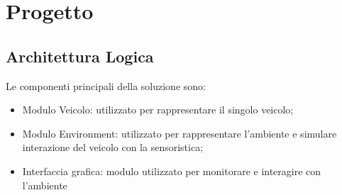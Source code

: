 \documentclass{memoir}
\begin{document}
%

\chapter{Progetto}

\section{Architettura Logica}
\label{sec:arclog}
Le componenti principali della soluzione sono:
\begin{itemize}
\item Modulo Veicolo: utilizzato per rappresentare il singolo veicolo;
\item Modulo Environment: utilizzato per rappresentare l'ambiente e simulare
  interazione del veicolo con la sensoristica;
\item Interfaccia grafica: modulo utilizzato per monitorare e interagire con l'ambiente
\end{itemize}
\end{document}
